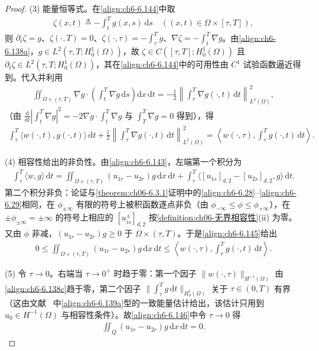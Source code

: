 \documentclass[../../main.tex]{subfiles}%
\begin{document}
\begin{proof}
(3) 能量恒等式。在\eqref{align:ch6-6.144}中取
\begin{align*}
\zeta(x,t)\triangleq-\int_t^Tg(x,s)\,\mathrm{d}s\quad((x,t)\in\Omega\times[\tau,T]),
\end{align*}
则 $\partial_t\zeta=g$、$\zeta(\cdot,T)=0$、$\zeta(\cdot,\tau)=-\int_\tau^Tg$、$\nabla\zeta=-\int_t^T\nabla g$。由\eqref{align:ch6-6.138a}，$g\in L^2(\tau,T;H^1_0(\Omega))$，故 $\zeta\in C([\tau,T];H^1_0(\Omega))$ 且 $\partial_t\zeta\in L^2(\tau,T;H^1_0(\Omega))$，其在\eqref{align:ch6-6.144}中的可用性由 $C^1$ 试验函数逼近得到。代入并利用
\begin{align*}
\iint_{\Omega\times(\tau,T)}\nabla g\cdot\left(\int_t^T\nabla g\,\mathrm{d}s\right)\mathrm{d}x\,\mathrm{d}t
=-\frac{1}{2}\left\|\int_\tau^T\nabla g(\cdot,t)\,\mathrm{d}t\right\|^2_{L^2(\Omega)},
\end{align*}
（由 $\frac{\mathrm{d}}{\mathrm{d}t}\left|\int_t^T\nabla g\right|^2=-2\nabla g\cdot\int_t^T\nabla g$ 与 $\int_T^T\nabla g=0$ 得到），得
\begin{align}
\int_\tau^T\langle w(\cdot,t),g(\cdot,t)\rangle\,\mathrm{d}t
+\frac{1}{2}\left\|\int_\tau^T\nabla g(\cdot,t)\,\mathrm{d}t\right\|^2_{L^2(\Omega)}
=\left\langle w(\cdot,\tau),\int_\tau^Tg(\cdot,t)\,\mathrm{d}t\right\rangle . \label{align:ch6-6.145}
\end{align}

(4) 相容性给出的非负性。由\eqref{align:ch6-6.143}，左端第一个积分为
\begin{align*}
\int_\tau^T\langle w,g\rangle\,\mathrm{d}t
=\iint_{\Omega\times(\tau,T)}(u_{1r}-u_{2r})g\,\mathrm{d}x\,\mathrm{d}t
+\int_\tau^T\langle[u_{1s}]_{d,2}-[u_{2s}]_{d,2},g\rangle\,\mathrm{d}t .
\end{align*}
第二个积分非负：论证与\cref{theorem:ch06-6.3.1}证明中的\eqref{align:ch6-6.28}--\eqref{align:ch6-6.29}相同，在 $\phi_{\pm\infty}$ 有限的符号上被积函数逐点非负（由 $\phi_{-\infty}\leqslant\phi\leqslant\phi_{+\infty}$），在 $\pm\phi_{\pm\infty}=\pm\infty$ 的符号上相应的 $[u^\pm_{is}]_{d,2}$ 按\cref{definition:ch06-无界相容性}(ii) 为零。又由 $\phi$ 非减，$(u_{1r}-u_{2r})g\geqslant0$ 于 $\Omega\times(\tau,T)$。于是\eqref{align:ch6-6.145}给出
\begin{align}
0\leqslant\iint_{\Omega\times(\tau,T)}(u_{1r}-u_{2r})g\,\mathrm{d}x\,\mathrm{d}t
\leqslant\left\langle w(\cdot,\tau),\int_\tau^Tg(\cdot,t)\,\mathrm{d}t\right\rangle . \label{align:ch6-6.146}
\end{align}

(5) 令 $\tau\to0$。右端当 $\tau\to0^+$ 时趋于零：第一个因子 $\|w(\cdot,\tau)\|_{H^{-1}(\Omega)}$ 由\eqref{align:ch6-6.138c}趋于零，第二个因子 $\|\int_\tau^Tg\,\mathrm{d}t\|_{H^1_0(\Omega)}$ 关于 $\tau\in(0,T)$ 有界（这由文献~\cite{ref87} 中\eqref{align:ch6-6.139a}型的一致能量估计给出，该估计只用到 $u_0\in H^{-1}(\Omega)$ 与相容性条件）。故\eqref{align:ch6-6.146}中令 $\tau\to0$ 得
\begin{align*}
\iint_Q(u_{1r}-u_{2r})g\,\mathrm{d}x\,\mathrm{d}t=0 .
\end{align*}


\end{proof}
\end{document}
